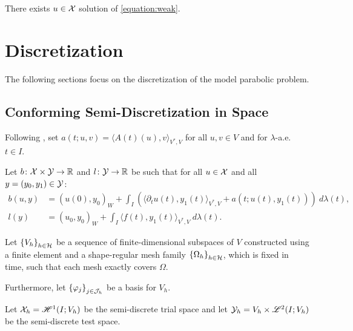 \begin{lemma}[Existence]
    There exists $u \in \mathcal{X}$ solution of \cref{equation:weak}.
\end{lemma}

\newpage
\section{Discretization} \label{section:dg_discretization}

The following sections focus on the discretization of the model parabolic problem.

\subsection{Conforming Semi-Discretization in Space} \label{subsection:space_discretization}

Following \cite[p.~135]{Ern2021}, set $a(t; u, v) = \langle A(t)(u), v \rangle_{V^*, V}$ for all $u, v \in V$ and for $\lambda$-a.e. $t \in I$.

\begin{definition}[$b$ and $l$]
    Let $b \colon \mathcal{X} \times \mathcal{Y} \rightarrow \mathbb{R}$ and $l \colon \mathcal{Y} \rightarrow \mathbb{R}$ be such that for all $u \in \mathcal{X}$ and all $y = (y_0, y_1) \in \mathcal{Y}$:
    \begin{align}
        b(u, y) &= \left( u(0), y_0 \right)_W + \int_I \left( \langle \partial_t u(t), y_1(t) \rangle_{V^*, V} + a(t; u(t), y_1(t)) \right)~ d \lambda(t), \\
        l(y) &= \left( u_0, y_0 \right)_W + \int_I \langle f(t), y_1(t) \rangle_{V^*, V} ~ d \lambda(t).
    \end{align}
\end{definition}

Let $\left\{ V_h \right\}_{h \in \mathcal{H}}$ be a sequence of finite-dimensional subspaces of $V$ constructed using a finite element and a shape-regular mesh family $\left\{ \Omega_{h} \right\}_{h \in \mathcal{H}}$, which is fixed in time, such that each mesh exactly covers $\Omega$.

Furthermore, let $\left\{ \varphi_j \right\}_{j \in \mathcal{J}_h}$ be a basis for $V_h$.

\begin{definition}
    Let $\mathcal{X}_h = \mathscr{H}^{1}(I; V_h)$ be the semi-discrete trial space and let $\mathcal{Y}_h = V_h \times \mathscr{L}^{2}(I; V_h)$ be the semi-discrete test space.
\end{definition}

